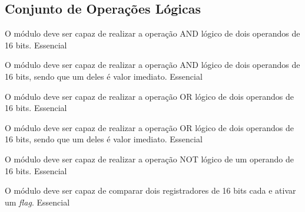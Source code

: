   \subsection{Conjunto de Operações Lógicas} 
  
    \begin{functional}
    
      {O módulo deve ser capaz de realizar a operação AND lógico de dois operandos de 16 bits.}
      {Essencial}
      
      {O módulo deve ser capaz de realizar a operação AND lógico de dois operandos de 16 bits, sendo que um deles é valor imediato.}
      {Essencial}

      {O módulo deve ser capaz de realizar a operação OR lógico de dois operandos de 16 bits.}
      {Essencial}  
      
      {O módulo deve ser capaz de realizar a operação OR lógico de dois operandos de 16 bits, sendo que um deles é valor imediato.}
      {Essencial} 
      
      {O módulo deve ser capaz de realizar a operação NOT lógico de um operando de 16 bits.}
      {Essencial}   
      
      {O módulo deve ser capaz de comparar dois registradores de 16 bits cada e ativar um \textit{flag}.}
      {Essencial}
      
    \end{functional}  